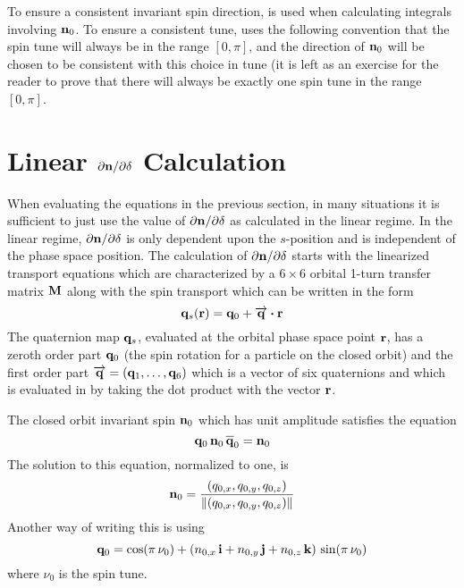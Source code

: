 To ensure a consistent invariant spin direction,  is used when calculating integrals
involving ${\bf n}_0$. To ensure a consistent tune, \bmad uses the following convention that the spin
tune will always be in the range $[0, \pi]$, and the direction of ${\bf n}_0$ will be chosen to be
consistent with this choice in tune (it is left as an exercise for the reader to prove that there
will always be exactly one spin tune in the range $[0, \pi]$.

\section{Linear \texorpdfstring{$\partial{\bf n}/\partial\delta$}{dn/dpz} Calculation}
\label{s:dn.calc}

When evaluating the equations in the previous section, in many situations it is sufficient to just
use the value of $\partial{\bf n}/\partial\delta$ as calculated in the linear regime. In the linear regime,
$\partial{\bf n}/\partial\delta$ is only dependent upon the $s$-position and is independent of the phase space
position. The calculation of $\partial{\bf n}/\partial\delta$ starts with the linearized transport equations which
are characterized by a $6\times6$ orbital 1-turn transfer matrix ${\bf M}$ along with the spin
transport which can be written in the form
\begin{equation}
  {\bf q}_s({\bf r}) = {\bf q}_0 + \overrightarrow{{\bf q}} \mathbin{\boldsymbol{\cdot}} {\bf r}
  \label{qqqr}
\end{equation}
The quaternion map ${\bf q}_s$, evaluated at the orbital phase space point ${\bf r}$, has a zeroth order
part ${\bf q}_0$ (the spin rotation for a particle on the closed orbit) and the first order part
$\overrightarrow{{\bf q}} = ({\bf q}_1, \ldots, {\bf q}_6)$ which is a vector of six quaternions and which is
evaluated in  by taking the dot product with the vector ${\bf r}$.

The closed orbit invariant spin ${\bf n}_0$ which has unit amplitude satisfies the equation
\begin{equation}
  \bfq_0 \, \bfn_0 \, \BAR\bfq_0 = \bfn_0
  \label{qnqn}
\end{equation}
The solution to this equation, normalized to one, is
\begin{equation}
  {\bf n}_0 = \frac{(q_{0,x}, q_{0,y}, q_{0,z})}{\|(q_{0,x}, q_{0,y}, q_{0,z})\|}
  \label{nkqqq}
\end{equation}
Another way of writing this is using 
\begin{equation}
  {\bf q}_0 = \cos(\pi \, \nu_0) + 
  (n_{0,x} \, {\bf i} + n_{0,y} \, {\bf j} + n_{0,z} \, {\bf k}) \, \sin(\pi \, \nu_0)
  \label{qnni}
\end{equation}
where $\nu_0$ is the spin tune.


